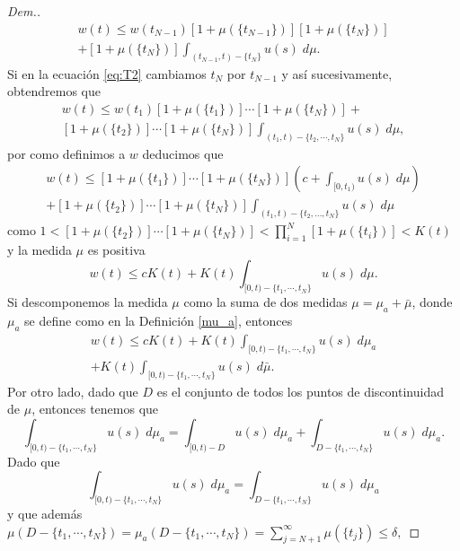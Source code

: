 \begin{proof}[Dem.]
\begin{multline*}
	w(t)\leq w(t_{N-1})\left[1+ \mu(\{t_{N-1}\})\right]\left[ 1+\mu(\{t_N\})\right] \\+\left[ 1+\mu(\{t_N\})\right]\int_{(t_{N-1},t)-\{t_N\}}u(s)\;d\mu. 
\end{multline*}
 Si en la ecuación \eqref{eq:T2} cambiamos $t_N$ por $t_{N-1}$ y así sucesivamente, obtendremos que  
	\begin{multline*}
		w(t)\leq w(t_1)\left[ 1+\mu(\{t_1\})\right]\cdots \left[ 1+\mu(\{t_N\})\right]+\\ \left[ 1+\mu(\{t_2\})\right]\cdots \left[ 1+\mu(\{t_N\})\right]\int_{(t_1,t)-\{t_2,\cdots ,t_N\}}u(s)\;d\mu,
	\end{multline*}
por como definimos a $w$ deducimos que
 	\begin{multline*}
		w(t)\leq \left[ 1+\mu(\{t_1\})\right]\cdots \left[ 1+\mu(\{t_N\})\right]\left( c+\int_{[0,t_1)}u(s)\; d\mu\right) \\ +\left[ 1+\mu(\{t_2\})\right]\cdots \left[ 1+\mu(\{t_N\})\right]\int_{(t_1,t)-\{t_2,\ldots ,t_N\}}u(s)\;d\mu
	\end{multline*}
	como $\displaystyle1< \left[ 1+\mu(\{t_2\})\right]\cdots \left[ 1+\mu(\{t_N\})\right]<\prod_{i=1}^{N}\left[ 1+\mu(\{t_i\}) \right]<K(t) $
y la medida $\mu$ es positiva 	
\begin{equation}
	w(t)\leq cK(t)+ K(t)\int_{[0,t)-\{t_1,\cdots ,t_N\}}u(s)\;d\mu.
\end{equation}
Si descomponemos  la medida $\mu$ como la suma de dos medidas $\mu=\mu_a+\bar{\mu}$, donde $\mu_a$ se define como en la Definición  \ref{mu_a}, entonces
\begin{equation}\label{eq:T3}
\begin{split}
	w(t)\leq cK(t)+ K(t)\int_{[0,t)-\{t_1,\cdots ,t_N\}}u(s)\;d\mu_a \\ +K(t)\int_{[0,t)-\{t_1,\cdots ,t_N\}}u(s)\;d\bar{\mu}.
 \end{split}
\end{equation}
Por otro lado, dado que $D$ es el conjunto de todos los puntos de discontinuidad de $\mu$, entonces tenemos que
\begin{equation*}
	\int_{[0,t)-\{t_1,\cdots ,t_N\}}u(s)\;d\mu_a=\int_{[0,t)-D}u(s)\;d\mu_a+\int_{D-\{t_1,\cdots ,t_N\}}u(s)\;d\mu_a.
\end{equation*}
Dado que
\begin{equation*}
	\int_{[0,t)-\{t_1,\cdots ,t_N\}}u(s)\;d\mu_a=\int_{D-\{t_1,\cdots ,t_N\}}u(s)\;d\mu_a
\end{equation*}
y que además $\mu\left(D-\{t_1,\cdots ,t_N\}\right)=\mu_a\left(D-\{t_1,\cdots ,t_N\}\right)=\displaystyle\sum_{j=N+1}^{\infty}\mu(\{t_j\})\leq \delta,$

\end{proof}
